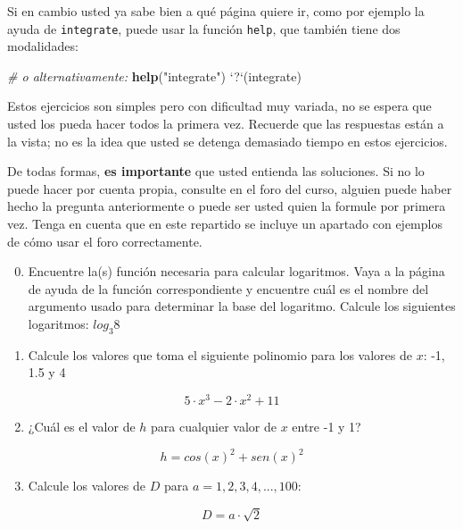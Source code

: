 \documentclass[]{article}
\newenvironment{Shaded}{}{}
\newcommand{\KeywordTok}[1]{\textcolor[rgb]{0.00,0.44,0.13}{\textbf{{#1}}}}
\newcommand{\DataTypeTok}[1]{\textcolor[rgb]{0.56,0.13,0.00}{{#1}}}
\newcommand{\StringTok}[1]{\textcolor[rgb]{0.25,0.44,0.63}{{#1}}}
\newcommand{\CommentTok}[1]{\textcolor[rgb]{0.38,0.63,0.69}{\textit{{#1}}}}
\newcommand{\NormalTok}[1]{{#1}}
\begin{document}
Si en cambio usted ya sabe bien a qué página quiere ir, como por ejemplo
la ayuda de \texttt{integrate}, puede usar la función \texttt{help}, que
también tiene dos modalidades:

\begin{Shaded}
\begin{Highlighting}[]
\CommentTok{# o alternativamente:}
\KeywordTok{help}\NormalTok{(}\StringTok{"integrate"}\NormalTok{)}
\StringTok{`}\DataTypeTok{?}\StringTok{`}\NormalTok{(integrate)}
\end{Highlighting}
\end{Shaded}
Estos ejercicios son simples pero con dificultad muy variada, no se
espera que usted los pueda hacer todos la primera vez. Recuerde que las
respuestas están a la vista; no es la idea que usted se detenga
demasiado tiempo en estos ejercicios.

De todas formas, \textbf{es importante} que usted entienda las
soluciones. Si no lo puede hacer por cuenta propia, consulte en el foro
del curso, alguien puede haber hecho la pregunta anteriormente o puede
ser usted quien la formule por primera vez. Tenga en cuenta que en este
repartido se incluye un apartado con ejemplos de cómo usar el foro
correctamente.

\begin{enumerate}[1.]
\setcounter{enumi}{-1}
\item
  Encuentre la(s) función necesaria para calcular logaritmos. Vaya a la
  página de ayuda de la función correspondiente y encuentre cuál es el
  nombre del argumento usado para determinar la base del logaritmo.
  Calcule los siguientes logaritmos: $log_3 8$
\item
  Calcule los valores que toma el siguiente polinomio para los valores
  de $x$: -1, 1.5 y 4
\end{enumerate}
\[
  5 \cdot x ^ 3 - 2 \cdot x ^ 2 + 11
\]

\begin{enumerate}[1.]
\setcounter{enumi}{1}
\item
  ¿Cuál es el valor de $h$ para cualquier valor de $x$ entre -1 y 1?
\end{enumerate}
\[
  h = cos(x) ^ 2 + sen(x) ^ 2
\]

\begin{enumerate}[1.]
\setcounter{enumi}{2}
\item
  Calcule los valores de $D$ para $a = 1, 2, 3, 4, ..., 100$:
\end{enumerate}
\[
  D = a \cdot \sqrt{2}
\]
\end{document}
